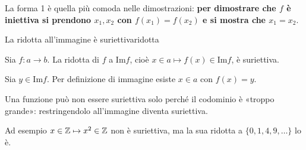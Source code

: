 La forma 1 è quella più comoda nelle dimostrazioni: \textbf{per dimostrare che $f$ è iniettiva si prendono $x_1, x_2$ con
$f(x_1) = f(x_2)$ e si mostra che $x_1 = x_2$}.


\begin{concetto}
\begin{Proposizione}{La ridotta all'immagine è suriettiva}{ridotta}
    \begin{prerequisiti}
    \end{prerequisiti}
    Sia $f \colon a \to b$. La ridotta di $f$ a $\mathrm{Im} f$, cioè $x \in a \mapsto f(x) \in \mathrm{Im} f$, è suriettiva.
\end{Proposizione}
\begin{dimostrazione}
    Sia $y \in \mathrm{Im} f$. Per definizione di immagine esiste $x \in a$ con $f(x) = y$.
\end{dimostrazione}
\end{concetto}

\begin{spiegazione}
    Una funzione può non essere suriettiva solo perché il codominio è «troppo grande»: restringendolo all'immagine diventa suriettiva.
    \begin{center}
    \end{center}
    Ad esempio $x \in \mathbb{Z} \mapsto x^2 \in \mathbb{Z}$ non è suriettiva, ma la sua ridotta a $\{0, 1, 4, 9, \dots\}$ lo è.
\end{spiegazione}



